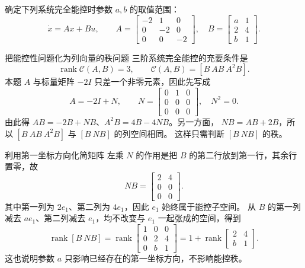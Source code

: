 \documentclass[11pt]{article}
\begin{document}

\begin{problem}[原题 7（2）]
确定下列系统完全能控时参数 $a,b$ 的取值范围：
\[
\dot x=Ax+Bu,\qquad
A=\begin{bmatrix}-2&1&0\\0&-2&0\\0&0&-2\end{bmatrix},\quad
B=\begin{bmatrix}a&1\\2&4\\b&1\end{bmatrix}.
\]
\end{problem}
\begin{solution}
\begin{proofstep}{把能控性问题化为列向量的秩问题}
三阶系统完全能控的充要条件是
\[
\operatorname{rank}\mathcal C(A,B)=3,\qquad
\mathcal C(A,B)=[B\ AB\ A^2B].
\]
本题 $A$ 与标量矩阵 $-2I$ 只差一个非零元素，因此先写成
\[
A=-2I+N,\qquad N=\begin{bmatrix}0&1&0\\0&0&0\\0&0&0\end{bmatrix},\quad N^2=0.
\]
由此得 $AB=-2B+NB$、$A^2B=4B-4NB$。另一方面，
$NB=AB+2B$，所以 $[B\ AB\ A^2B]$ 与 $[B\ NB]$ 的列空间相同。
这样只需判断 $[B\ NB]$ 的秩。
\end{proofstep}

\begin{proofstep}{利用第一坐标方向化简矩阵}
左乘 $N$ 的作用是把 $B$ 的第二行放到第一行，其余行置零，故
\[
NB=\begin{bmatrix}2&4\\0&0\\0&0\end{bmatrix}.
\]
其中第一列为 $2e_1$、第二列为 $4e_1$，因此 $e_1$ 始终属于能控子空间。
从 $B$ 的第一列减去 $ae_1$、第二列减去 $e_1$，均不改变与 $e_1$ 一起张成的空间，得到
\[
\operatorname{rank}[B\ NB]
=\operatorname{rank}\begin{bmatrix}1&0&0\\0&2&4\\0&b&1\end{bmatrix}
=1+\operatorname{rank}\begin{bmatrix}2&4\\b&1\end{bmatrix}.
\]
这也说明参数 $a$ 只影响已经存在的第一坐标方向，不影响能控秩。
\end{proofstep}


\end{solution}
\end{document}
